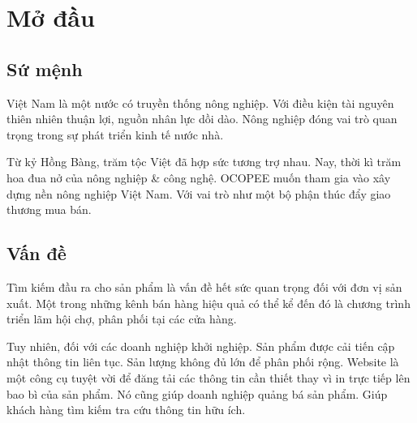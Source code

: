 \documentclass[11pt]{report}
\newcommand{\advisor}{TS. Lê Thị Mỹ Hạnh}
\begin{document}
\pagestyle{fancy}
\fancyhf{}
\fancyhead[CE,CO]{\emph{{\normalsize {\@title}}}}


\fancyfoot[CE,CO]{{\normalsize {Hướng dẫn: \advisor}}	
}
\fancyfoot[LE,RO]{\thepage}

\renewcommand{\headrulewidth}{0.3pt}
\renewcommand{\footrulewidth}{0.3pt}




\setcounter{page}{1}
%
\section*{Mở đầu}

%
\subsection*{Sứ mệnh}
Việt Nam là một nước có truyền thống nông nghiệp. Với điều kiện tài nguyên thiên nhiên thuận lợi, nguồn nhân lực dồi dào. Nông nghiệp đóng vai trò quan trọng trong sự phát triển kinh tế nước nhà.

Từ kỷ Hồng Bàng, trăm tộc Việt đã hợp sức tương trợ nhau. Nay, thời kì trăm hoa đua nở của nông nghiệp \& công nghệ. OCOPEE muốn tham gia vào xây dựng nền nông nghiệp Việt Nam. Với vai trò như một bộ phận thúc đẩy giao thương mua bán.

%
\subsection*{Vấn đề}
Tìm kiếm đầu ra cho sản phẩm là vấn đề hết sức quan trọng đối với đơn vị sản xuất. Một trong những kênh bán hàng hiệu quả có thể kể đến đó là chương trình triển lãm hội chợ, phân phối tại các cửa hàng.

Tuy nhiên, đối với các doanh nghiệp khởi nghiệp. Sản phẩm được cải tiến cập nhật thông tin liên tục. Sản lượng không đủ lớn để phân phối rộng. Website là một công cụ tuyệt vời để đăng tải các thông tin cần thiết thay vì in trực tiếp lên bao bì của sản phẩm. Nó cũng giúp doanh nghiệp quảng bá sản phẩm. Giúp khách hàng tìm kiếm tra cứu thông tin hữu ích.
\end{document}
